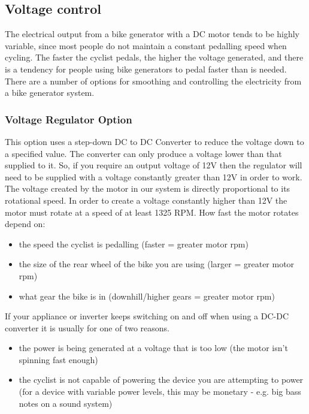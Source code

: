 \documentclass{article}
\theoremstyle{definition}
\theoremstyle{definition}
\theoremstyle{remark}
\begin{document}

  {\color{blue}\subsection{Voltage control}} %
  \label{sub:voltage_control}

    The electrical output from a bike generator with a DC motor tends to be highly variable, since most people do not maintain a constant pedalling speed when cycling. The faster the cyclist pedals, the higher the voltage generated, and there is a tendency for people using bike generators to pedal faster than is needed. There are a number of options for smoothing and controlling the electricity from a bike generator system.

    \subsubsection{Voltage Regulator Option} %
    \label{ssub:voltage_regulator_option}

      This option uses a step-down DC to DC Converter to reduce the voltage down to a specified value. The converter can only produce a voltage lower than that supplied to it. So, if you require an output voltage of 12V then the regulator will need to be supplied with a voltage constantly greater than 12V in order to work. The voltage created by the motor in our system is directly proportional to its rotational speed. In order to create a voltage constantly higher than 12V the motor must rotate at a speed of at least 1325 RPM. How fast the motor rotates depend on:

      \begin{itemize}
        \item the speed the cyclist is pedalling (faster = greater motor rpm)
        \item the size of the rear wheel of the bike you are using (larger = greater motor rpm)
        \item what gear the bike is in (downhill/higher gears = greater motor rpm)
      \end{itemize}

      If your appliance or inverter keeps switching on and off when using a DC-DC converter it is usually for one of two reasons.

      \begin{itemize}
        \item the power is being generated at a voltage that is too low (the motor isn't spinning fast enough)
        \item the cyclist is not capable of powering the device you are attempting to power (for a device with variable power levels, this may be monetary - e.g. big bass notes on a sound system)
      \end{itemize}
    
\end{document}
